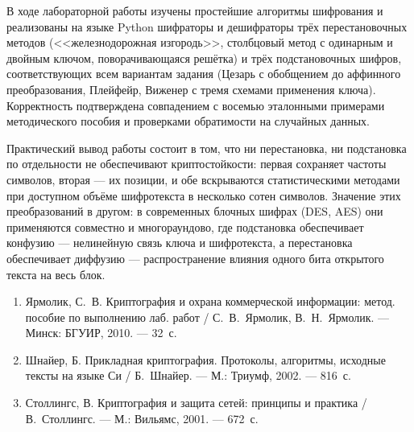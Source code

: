 \documentclass[14pt,a4paper]{extarticle}
\begin{document}

В ходе лабораторной работы изучены простейшие алгоритмы шифрования и реализованы на
языке Python шифраторы и дешифраторы трёх перестановочных методов
(<<железнодорожная изгородь>>, столбцовый метод с одинарным и двойным ключом,
поворачивающаяся решётка) и трёх подстановочных шифров, соответствующих всем вариантам
задания (Цезарь с обобщением до аффинного преобразования, Плейфейр, Виженер с тремя
схемами применения ключа). Корректность подтверждена совпадением с восемью эталонными
примерами методического пособия и проверками обратимости на случайных данных.

Практический вывод работы состоит в том, что ни перестановка, ни подстановка по
отдельности не обеспечивают криптостойкости: первая сохраняет частоты символов, вторая
--- их позиции, и обе вскрываются статистическими методами при доступном объёме
шифротекста в несколько сотен символов. Значение этих преобразований в другом: в
современных блочных шифрах (DES, AES) они применяются совместно и многораундово, где
подстановка обеспечивает конфузию --- нелинейную связь ключа и шифротекста, а
перестановка обеспечивает диффузию --- распространение влияния одного бита открытого
текста на весь блок.


\begin{enumerate}
\item Ярмолик, С.~В. Криптография и охрана коммерческой информации: метод. пособие по
выполнению лаб. работ / С.~В.~Ярмолик, В.~Н.~Ярмолик. --- Минск: БГУИР, 2010. --- 32~с.
\item Шнайер, Б. Прикладная криптография. Протоколы, алгоритмы, исходные тексты на
языке Си / Б.~Шнайер. --- М.: Триумф, 2002. --- 816~с.
\item Столлингс, В. Криптография и защита сетей: принципы и практика /
В.~Столлингс. --- М.: Вильямс, 2001. --- 672~с.
\end{enumerate}
\end{document}
